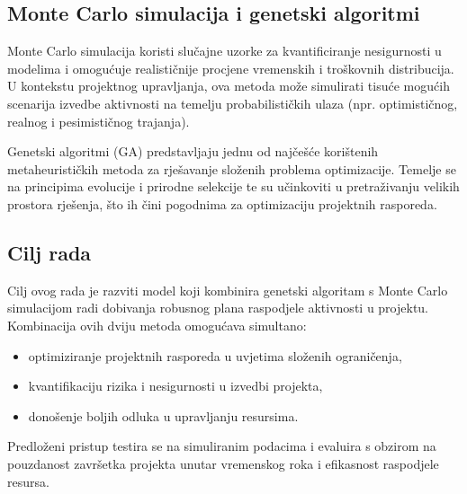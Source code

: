 \subsection{Monte Carlo simulacija i genetski algoritmi}

Monte Carlo simulacija koristi slučajne uzorke za kvantificiranje nesigurnosti u modelima i omogućuje realističnije procjene vremenskih i troškovnih distribucija. U kontekstu projektnog upravljanja, ova metoda može simulirati tisuće mogućih scenarija izvedbe aktivnosti na temelju probabilističkih ulaza (npr. optimističnog, realnog i pesimističnog trajanja).

Genetski algoritmi (GA) predstavljaju jednu od najčešće korištenih metaheurističkih metoda za rješavanje složenih problema optimizacije. Temelje se na principima evolucije i prirodne selekcije te su učinkoviti u pretraživanju velikih prostora rješenja, što ih čini pogodnima za optimizaciju projektnih rasporeda.

\subsection{Cilj rada}

Cilj ovog rada je razviti model koji kombinira genetski algoritam s Monte Carlo simulacijom radi dobivanja robusnog plana raspodjele aktivnosti u projektu. Kombinacija ovih dviju metoda omogućava simultano:
\begin{itemize}
    \item optimiziranje projektnih rasporeda u uvjetima složenih ograničenja,
    \item kvantifikaciju rizika i nesigurnosti u izvedbi projekta,
    \item donošenje boljih odluka u upravljanju resursima.
\end{itemize}

Predloženi pristup testira se na simuliranim podacima i evaluira s obzirom na pouzdanost završetka projekta unutar vremenskog roka i efikasnost raspodjele resursa.

